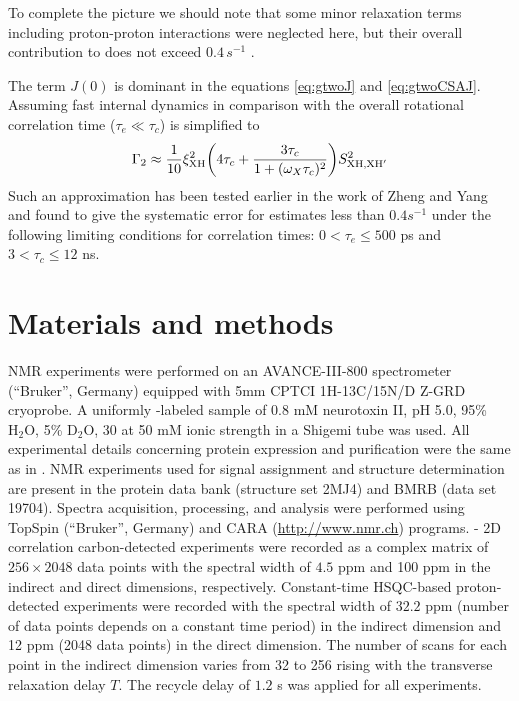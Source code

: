 \documentclass[twocolumn]{svjour3}           %
\begin{document}
To complete the picture we should note that some minor 
relaxation terms including proton-proton interactions
were neglected here, but their overall contribution to \gtwo{} 
does not exceed $0.4\,s^{-1}$ 
\cite{zheng_measurement_2004}.

The term $J(0)$ is dominant in the equations \eqref{eq:gtwoJ} and 
\eqref{eq:gtwoCSAJ}.
Assuming fast internal dynamics in comparison with the overall rotational 
correlation time ($\tau_e \ll \tau_c$)  \gtwoCH{} is 
simplified to
\begin{align}
  \label{eq:gtwo:tauc}
  \Gamma_2  \approx \frac{1}{10}  \xi_\text{XH}^2
  \biggl(4 \tau_c + \frac{3 \tau_c}{1 + (\omega_X \tau_c )^2 } 
  \biggr ) S^2_{\text{XH,XH}'}
\end{align}
Such an approximation has been tested earlier in the work of Zheng and Yang 
\cite{zheng_measurement_2004} and found to give the systematic error for 
\gtwoCH{} estimates less than $0.4 s^{-⁠1}$ under the following 
limiting conditions for correlation times: $0 < \tau_e \le 500$ ps and 
$3 < \tau_c \le 12$ ns.


\section{Materials and methods}
\label{mmeth}

NMR experiments were performed on an {AVANCE}-{III}-800 spectrometer 
(\enquote{Bruker}, Germany) equipped with 5mm {CPTCI} {1H-13C/15N/D} 
{Z-GRD} cryoprobe. A uniformly \nclab-labeled sample of 0.8 mM 
neurotoxin II, pH 5.0, 95\% $\text{H}_2\text{O}$, 5\% 
$\text{D}_2\text{O}$, 30 at 50 mM 
ionic strength in a Shigemi tube was used. All experimental details 
concerning protein expression and purification were the same as in 
\cite{bocharov_resonance_2003}. NMR experiments used for signal 
assignment and structure determination are present in the protein 
data bank (structure set 2MJ4) and BMRB (data set 19704). Spectra 
acquisition, processing, and analysis were performed using TopSpin 
(\enquote{Bruker}, Germany) and CARA (\url{http://www.nmr.ch}) 
programs. \hlab-\clab{} 2D correlation carbon-detected experiments 
were recorded as a complex matrix of $256\times 2048$ data points 
with the spectral width of $4.5$ ppm and 100 ppm in the indirect 
\hlab{} and direct \clab{} dimensions, respectively. Constant-time 
{HSQC}-based proton-detected experiments were recorded with the 
spectral width of $32.2$ ppm (number of data points depends on a 
constant time period) in the indirect \clab{} dimension and 12 ppm 
(2048 data points) in the direct \hlab{} dimension. The number of 
scans for each point in the indirect dimension varies from 32 to 
256 rising with the transverse relaxation delay $T$. The recycle 
delay of $1.2$ s was applied for all experiments. 
\end{document}
